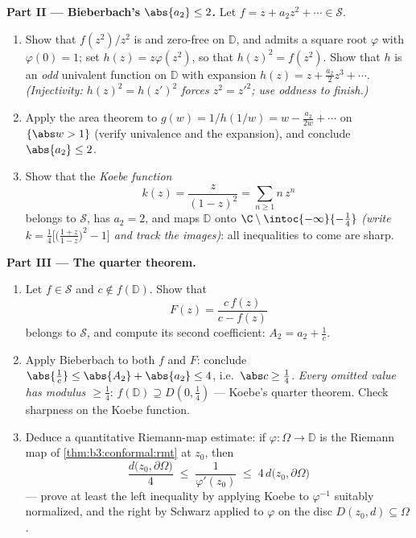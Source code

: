 \begin{problem}
\medskip
\noindent\textbf{Part II --- Bieberbach's $\abs{a_2} \leq
2$.} Let $f = z + a_2z^2 + \cdots \in \mathcal S$.
\begin{enumerate}[resume]
  \item Show that $f(z^2)/z^2$ is  and zero-free
        on $\mathbb D$, and admits a  square root
        $\varphi$ with $\varphi(0) = 1$; set $h(z) =
        z\varphi(z^2)$, so that $h(z)^2 = f(z^2)$. Show that
        $h$ is an \emph{odd} univalent function on $\mathbb
        D$ with expansion $h(z) = z + \frac{a_2}2z^3 +
        \cdots$. \emph{(Injectivity: $h(z)^2 = h(z')^2$
        forces $z^2 = z'^2$; use oddness to finish.)}
  \item Apply the area theorem to $g(w) = 1/h(1/w) = w -
        \frac{a_2}{2w} + \cdots$ on $\{\abs w > 1\}$
        (verify univalence and the expansion), and conclude
        $\abs{a_2} \leq 2$.
  \item Show that the \emph{Koebe function}
        \[
        k(z) = \frac{z}{(1 - z)^2} = \sum_{n\geq1}n\,z^n
        \]
        belongs to $\mathcal S$, has $a_2 = 2$, and maps
        $\mathbb D$ onto $\C\setminus\intoc{-\infty}{-\frac14}$
        \emph{(write $k = \frac14\bigl[\bigl(\frac{1+z}{1 -
        z}\bigr)^2 - 1\bigr]$ and track the images)}: all
        inequalities to come are sharp.
\end{enumerate}

\medskip
\noindent\textbf{Part III --- The quarter theorem.}
\begin{enumerate}[resume]
  \item Let $f \in \mathcal S$ and $c \notin f(\mathbb D)$.
        Show that
        \[
        F(z) = \frac{c\,f(z)}{c - f(z)}
        \]
        belongs to $\mathcal S$, and compute its second
        coefficient: $A_2 = a_2 + \frac1c$.
  \item Apply Bieberbach to both $f$ and $F$: conclude
        $\abs{\frac1c} \leq \abs{A_2} + \abs{a_2} \leq 4$,
        i.e.\ $\abs c \geq \frac14$. \emph{Every omitted value
        has modulus $\geq \frac14$}: $f(\mathbb D) \supseteq
        D(0, \frac14)$ --- Koebe's quarter theorem. Check
        sharpness on the Koebe function.
  \item Deduce a quantitative Riemann-map estimate: if
        $\varphi \colon \Omega \to \mathbb D$ is the Riemann
        map of \cref{thm:b3:conformal:rmt} at $z_0$, then
        \[
        \frac{d\bigl(z_0, \partial\Omega\bigr)}{4}
        \;\leq\; \frac1{\varphi'(z_0)} \;\leq\;
        4\,d\bigl(z_0, \partial\Omega\bigr)
        \]
        --- prove at least the left inequality by applying
        Koebe to $\varphi^{-1}$ suitably normalized, and the
        right by Schwarz applied to $\varphi$ on the disc
        $D(z_0, d) \subseteq \Omega$.
\end{enumerate}


\end{problem}
